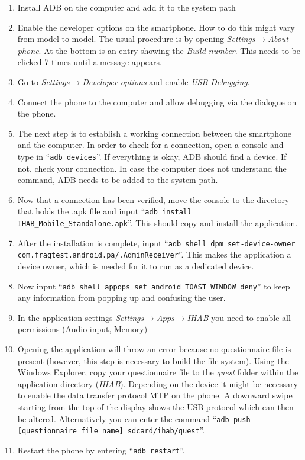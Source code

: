 \documentclass[11pt,a4paper,titlepage]{article}
\begin{document}
\begin{enumerate}

	\item Install ADB on the computer and add it to the system path
	\item Enable the developer options on the smartphone. How to do this might vary from model to model. The usual procedure is by opening \textit{Settings$\rightarrow$About phone}. At the bottom is an entry showing the \textit{Build number}. This needs to be clicked 7 times until a message appears.
	\item Go to \textit{Settings}$\rightarrow$\textit{Developer options} and enable \textit{USB Debugging}.
	\item Connect the phone to the computer and allow debugging via the dialogue on the phone.
	\item The next step is to establish a working connection between the smartphone and the computer. In order to check for a connection, open a console and type in ``\texttt{adb devices}''. If everything is okay, ADB should find a device. If not, check your connection. In case the computer does not understand the command, ADB needs to be added to the system path.
	\item Now that a connection has been verified, move the console to the directory that holds the .apk file and input ``\texttt{adb install IHAB\_Mobile\_Standalone.apk}''. This should copy and install the application. 
	\item After the installation is complete, input ``\texttt{adb shell dpm set-device-owner \newline com.fragtest.android.pa/.AdminReceiver}''. This makes the application a device owner, which is needed for it to run as a dedicated device.
	\item Now input ``\texttt{adb shell appops set android TOAST\_WINDOW deny}'' to keep any information from popping up and confusing the user.
	\item In the application settings \textit{Settings}$\rightarrow$\textit{Apps}$\rightarrow$\textit{IHAB} you need to enable all permissions (Audio input, Memory)
	\item Opening the application will throw an error because no questionnaire file is present (however, this step is necessary to build the file system). Using the Windows Explorer, copy your questionnaire file to the \textit{quest} folder within the application directory (\textit{IHAB}). Depending on the device it might be necessary to enable the data transfer protocol MTP on the phone. A downward swipe starting from the top of the display shows the USB protocol which can then be altered. Alternatively you can enter the command ``\texttt{adb push [questionnaire file name] sdcard/ihab/quest}''.
	\item Restart the phone by entering ``\texttt{adb restart}''.
\end{enumerate}
\end{document}

